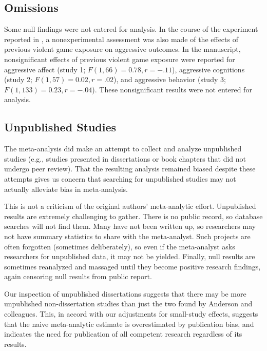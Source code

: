 \documentclass[man]{apa6}
\begin{document}
\subsection{Omissions}
Some null findings were not entered for analysis. %
In the course of the experiment reported in \citet{Carnagey:Anderson:2005}, a nonexperimental assessment was also made of the effects of previous violent game exposure on aggressive outcomes. In the manuscript, nonsignificant effects of previous violent game exposure were reported for aggressive affect (study 1; $F(1, 66) = 0.78, r = -.11$), aggressive cognitions (study 2; $F(1, 57) = 0.02, r = .02$), and aggressive behavior (study 3; $F(1, 133) = 0.23, r = -.04$). These nonsignificant results were not entered for analysis.

\subsection{Unpublished Studies}
The \citep{Anderson:etal:2010} meta-analysis did make an attempt to collect and analyze unpublished studies (e.g., studies presented in dissertations or book chapters that did not undergo peer review). That the resulting analysis remained biased despite these attempts gives us concern that searching for unpublished studies may not actually alleviate bias in meta-analysis. 

This is not a criticism of the original authors' meta-analytic effort. Unpublished results are extremely challenging to gather. There is no public record, so database searches will not find them. Many have not been written up, so researchers may not have summary statistics to share with the meta-analyst. Such projects are often forgotten (sometimes deliberately), so even if the meta-analyst asks researchers for unpublished data, it may not be yielded. Finally, null results are sometimes reanalyzed and massaged until they become positive research findings, again censoring null results from public report.

Our inspection of unpublished dissertations suggests that there may be more unpublished non-dissertation studies than just the two found by Anderson and colleagues. This, in accord with our adjustments for small-study effects, suggests that the naive meta-analytic estimate is overestimated by publication bias, and indicates the need for publication of all competent research regardless of its results. 
\end{document}
